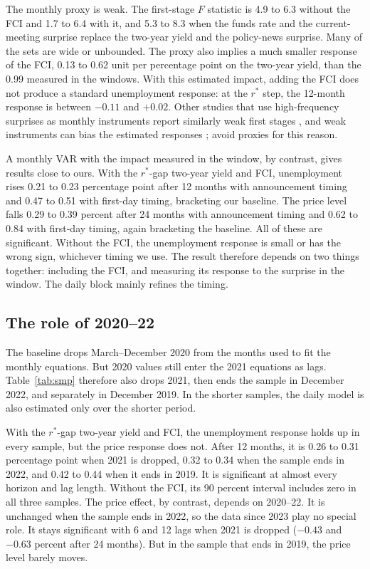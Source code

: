 \documentclass[11pt]{article}
\newcommand{\rs}{r^{*}}
\begin{document}
The monthly proxy is weak. The first-stage $F$ statistic is 4.9 to 6.3 without the FCI and 1.7 to 6.4 with it, and 5.3 to 8.3 when the funds rate and the current-meeting surprise replace the two-year yield and the policy-news surprise. Many of the sets are wide or unbounded. The proxy also implies a much smaller response of the FCI, 0.13 to 0.62 unit per percentage point on the two-year yield, than the 0.99 measured in the windows. With this estimated impact, adding the FCI does not produce a standard unemployment response: at the $\rs$ step, the 12-month response is between $-0.11$ and $+0.02$. Other studies that use high-frequency surprises as monthly instruments report similarly weak first stages \citep{bauer2026}, and weak instruments can bias the estimated responses \citep{lewis2026}; \citet{boehm2026} avoid proxies for this reason.

A monthly VAR with the impact measured in the window, by contrast, gives results close to ours. With the $\rs$-gap two-year yield and FCI, unemployment rises 0.21 to 0.23 percentage point after 12 months with announcement timing and 0.47 to 0.51 with first-day timing, bracketing our baseline. The price level falls 0.29 to 0.39 percent after 24 months with announcement timing and 0.62 to 0.84 with first-day timing, again bracketing the baseline. All of these are significant. Without the FCI, the unemployment response is small or has the wrong sign, whichever timing we use. The result therefore depends on two things together: including the FCI, and measuring its response to the surprise in the window. The daily block mainly refines the timing.

\subsection{The role of 2020--22}\label{sec:recent}
The baseline drops March--December 2020 from the months used to fit the monthly equations. But 2020 values still enter the 2021 equations as lags. Table~\ref{tab:smp} therefore also drops 2021, then ends the sample in December 2022, and separately in December 2019. In the shorter samples, the daily model is also estimated only over the shorter period.

With the $\rs$-gap two-year yield and FCI, the unemployment response holds up in every sample, but the price response does not. After 12 months, it is 0.26 to 0.31 percentage point when 2021 is dropped, 0.32 to 0.34 when the sample ends in 2022, and 0.42 to 0.44 when it ends in 2019. It is significant at almost every horizon and lag length. Without the FCI, its 90 percent interval includes zero in all three samples. The price effect, by contrast, depends on 2020--22. It is unchanged when the sample ends in 2022, so the data since 2023 play no special role. It stays significant with 6 and 12 lags when 2021 is dropped ($-0.43$ and $-0.63$ percent after 24 months). But in the sample that ends in 2019, the price level barely moves.
\end{document}
